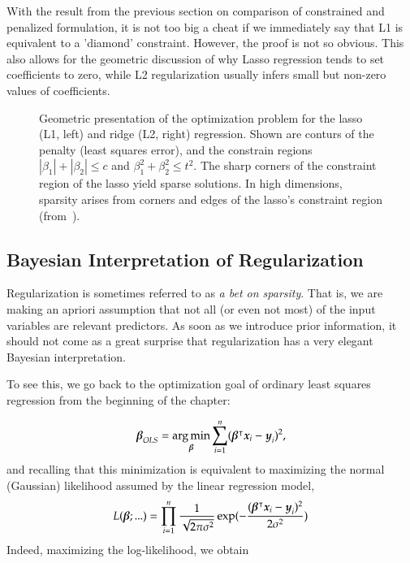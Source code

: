 \begin{refsection}
With the result from the previous section on comparison of constrained and penalized formulation, it is not too big a cheat if we immediately say that L1 is equivalent to a 'diamond' constraint. However, the proof is not so obvious. This also allows for the geometric discussion of why Lasso regression tends to set coefficients to zero, while L2 regularization usually infers small but non-zero values of coefficients.

\begin{figure}
\caption{Geometric presentation of the optimization problem for the lasso (L1, left) and ridge (L2, right) regression. Shown are conturs of the penalty (least squares error), and the constrain regions $|\beta_1|+|\beta_2|\leq c$ and $\beta_1^2+\beta_2^2\leq t^2$. The sharp corners of the constraint region of the lasso yield sparse solutions. In high dimensions, sparsity arises from corners and edges of the lasso's constraint region (from~\cite{Tibshirani2014}).}
\end{figure}


\subsection*{Bayesian Interpretation of Regularization}

Regularization is sometimes referred to as \emph{a bet on sparsity}. That is, we are making an apriori assumption that not all (or even not most) of the input variables are relevant predictors. As soon as we introduce prior information, it should not come as a great surprise that regularization has a very elegant Bayesian interpretation.

To see this, we go back to the optimization goal of ordinary least squares regression from the beginning of the chapter:

$$\boldsymbol{\beta}_{OLS} = \operatorname*{arg\,min}_{\boldsymbol{\beta}} \sum_{i=1}^n (\boldsymbol{\beta}^\intercal\boldsymbol{x}_i - \boldsymbol{y}_i)^2,$$
%
and recalling that this minimization is equivalent to maximizing the normal (Gaussian) likelihood assumed by the linear regression model,
%
$$L(\boldsymbol{\beta};...) = \prod_{i=1}^n \frac{1}{\sqrt{2\pi\sigma^2}}\exp(-\frac{(\boldsymbol{\beta}^\intercal\boldsymbol{x}_i - \boldsymbol{y}_i)^2}{2\sigma^2})$$
Indeed, maximizing the log-likelihood, we obtain
 

\end{refsection}
